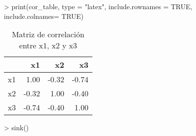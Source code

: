 
> print(cor_table, type = "latex", include.rownames = TRUE, include.colnames= TRUE)
\begin{table}[ht]
\centering
\begin{tabular}{rrrr}
  \hline
 & x1 & x2 & x3 \\ 
  \hline
x1 & 1.00 & -0.32 & -0.74 \\ 
  x2 & -0.32 & 1.00 & -0.40 \\ 
  x3 & -0.74 & -0.40 & 1.00 \\ 
   \hline
\end{tabular}
\caption{Matriz de correlación entre x1, x2 y x3} 
\end{table}

> sink()
